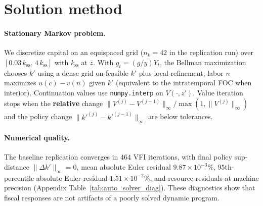 \documentclass[11pt,a4paper]{article}
\begin{document}

\section{Solution method}

\paragraph{Stationary Markov problem.}
We discretize capital on an equispaced grid ($n_k=42$ in the replication run) over $[0.03\,k_{\mathrm{ss}},\,4\,k_{\mathrm{ss}}]$ with $k_{\mathrm{ss}}$ at $\bar z$. With $g_t=(g/y)Y_t$, the Bellman maximization chooses $k'$ using a dense grid on feasible $k'$ plus local refinement; labor $n$ maximizes $u(c)-v(n)$ given $k'$ (equivalent to the intratemporal FOC when interior). Continuation values use \texttt{numpy.interp} on $V(\cdot,z')$. Value iteration stops when the \textbf{relative} change $\|V^{(j)}-V^{(j-1)}\|_\infty/\max(1,\|V^{(j)}\|_\infty)$ and the policy change $\|k'^{(j)}-k'^{(j-1)}\|_\infty$ are below tolerances.

\paragraph{Numerical quality.}
The baseline replication converges in $464$ VFI iterations, with final policy sup-distance $\|\Delta k'\|_\infty = 0$, mean absolute Euler residual $9.87\times 10^{-3}\%$, $95$th-percentile absolute Euler residual $1.51\times 10^{-2}\%$, and resource residuals at machine precision (Appendix Table~\ref{tab:auto_solver_diag}). These diagnostics show that fiscal responses are not artifacts of a poorly solved dynamic program.
\end{document}
